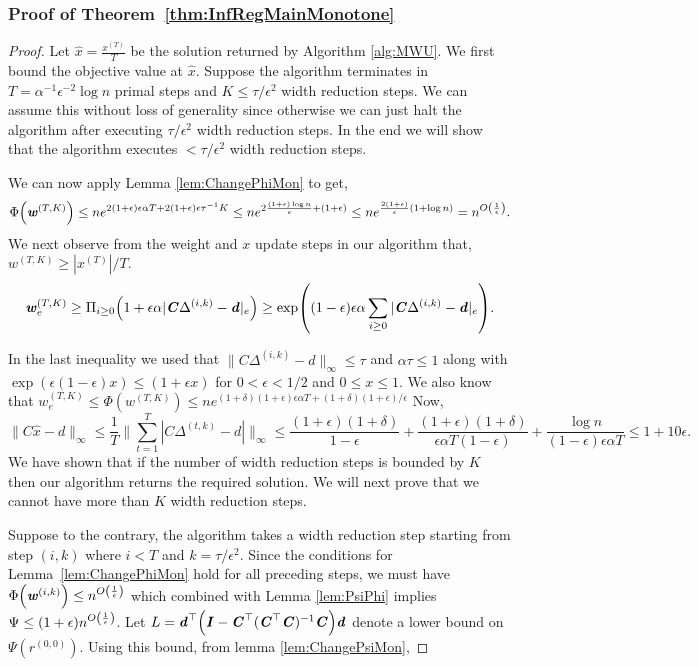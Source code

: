 \documentclass[11pt]{article}
\let\originalleft\left
\let\originalright\right
\renewcommand{\left}{\mathopen{}\mathclose\bgroup\originalleft}
\renewcommand{\right}{\aftergroup\egroup\originalright}
\newcommand\dd{\boldsymbol{\mathit{d}}}
\newcommand\rr{\boldsymbol{\mathit{r}}}
\newcommand\ww{\boldsymbol{\mathit{w}}}
\newcommand\xx{\boldsymbol{\mathit{x}}}
\newcommand\CC{\boldsymbol{\mathit{C}}}
\newcommand\II{\boldsymbol{\mathit{I}}}
\newcommand\xxhat{\widehat{\xx}}
\begin{document}
\subsubsection*{Proof of Theorem~\ref{thm:InfRegMainMonotone}}
\begin{proof}
Let $\xxhat = \frac{\xx^{(T)}}{T}$ be the solution returned by Algorithm \ref{alg:MWU}. We first bound the objective value at $\xxhat$. Suppose the algorithm terminates in $T = \alpha^{-1}\epsilon^{-2}\log n$ primal steps and $K \leq \tau/\epsilon^2$ width reduction steps. We can assume this without loss of generality since otherwise we can just halt the algorithm after executing $\tau/\epsilon^2$ width reduction steps. In the end we will show that the algorithm executes $<\tau/\epsilon^2$ width reduction steps. 

We can now apply Lemma \ref{lem:ChangePhiMon} to get,
\[
\Phi\left(\ww^{(T,K)}\right) \le  n e^{2(1+\epsilon)\epsilon\alpha T + 2(1+\epsilon)\epsilon\tau^{-1}K}\leq ne^{2\frac{(1+\epsilon)\log n}{\epsilon}+(1+\epsilon)} \leq ne^{\frac{2(1+\epsilon)}{\epsilon}(1 +\log n)} = n^{O\left(\frac{1}{\epsilon} \right)}.
\]
We next observe from the weight and $\xx$ update steps in our algorithm that, $\ww^{(T,K)} \geq |\xx^{(T)}|/T$.
\[
\ww_e^{(T,K)} \geq  \Pi_{i\geq 0}\left(1+\epsilon\alpha|\CC\Delta^{(i,k)}-\dd|_e\right)\geq \exp\left((1-\epsilon)\epsilon\alpha \sum_{i\geq 0}|\CC\Delta^{(i,k)}-\dd|_e\right).
\]

In the last inequality we used that $\|\CC\Delta^{(i,k)}-\dd\|_{\infty}\leq \tau$ and $\alpha\tau \leq 1$ along with $\exp(\epsilon(1-\epsilon)x) \leq(1+\epsilon x)$ for $0<\epsilon <1/2$ and $0\leq x\leq 1$. We also know that $\ww_e^{(T,K)}\leq \Phi(\ww^{(T,K)}) \leq ne^{(1+\delta)(1+\epsilon)\epsilon\alpha T + (1+\delta)(1+\epsilon)/\epsilon }$
Now, 
\[
\|\CC\xxhat-\dd\|_{\infty}\leq \frac{1}{T}\|\sum_{t=1}^T|\CC\Delta^{(t,k)}-\dd|\|_{\infty} \leq \frac{(1+\epsilon)(1+\delta)}{1-\epsilon} + \frac{(1+\epsilon)(1+\delta)}{\epsilon \alpha T (1-\epsilon)} + \frac{\log n}{(1-\epsilon)\epsilon \alpha T} \leq 1+10\epsilon.
\]
We have shown that if the number of width reduction steps is bounded by $K$ then our algorithm returns the required solution. We will next prove that we cannot have more than $K$ width reduction steps.

Suppose to the contrary, the algorithm takes a width reduction step starting from step $(i,k)$ where $i < T$ and  $k = \tau/\epsilon^2$. Since the conditions for Lemma~\ref{lem:ChangePhiMon} hold for all preceding steps, we must have $\Phi\left(\ww^{(i,k)}\right) \leq n^{O\left(\frac{1}{\epsilon} \right)}$ which combined with Lemma \ref{lem:PsiPhi} implies $\Psi \leq (1+\epsilon)n^{O\left(\frac{1}{\epsilon} \right)}$. Let $L = \dd^{\top}\left(\II - \CC^{\top}(\CC^{\top}\CC)^{-1}\CC\right)\dd$ denote a lower bound on $\Psi(\rr^{(0,0)})$. Using this bound, from lemma \ref{lem:ChangePsiMon},


\end{proof}
\end{document}
